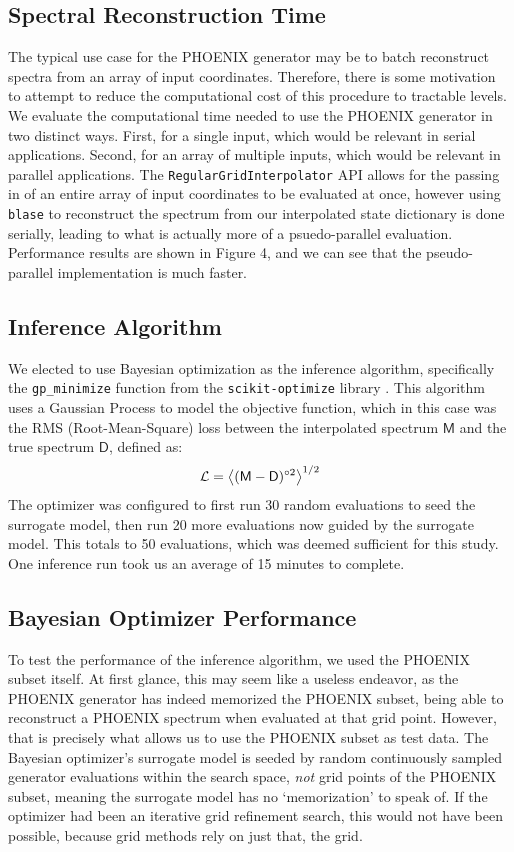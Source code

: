 \documentclass[twocolumn]{aastex631}
\begin{document}
\subsection{Spectral Reconstruction Time}
The typical use case for the PHOENIX generator may be to batch 
reconstruct spectra from an array of input coordinates. Therefore, there
is some motivation to attempt to reduce the computational cost of this
procedure to tractable levels. We evaluate the computational time needed
to use the PHOENIX generator in two distinct ways. First, for a single
input, which would be relevant in serial applications. Second, for an array
of multiple inputs, which would be relevant in parallel applications.
The \texttt{RegularGridInterpolator} API allows for the passing in of 
an entire array of input coordinates to be evaluated at once, however 
using \texttt{blase} to reconstruct the spectrum from our interpolated
state dictionary is done serially, leading to what is actually more of 
a psuedo-parallel evaluation. Performance results are shown in Figure 4,
and we can see that the pseudo-parallel implementation is much faster.

\subsection{Inference Algorithm}
We elected to use Bayesian optimization as the inference algorithm, specifically 
the \texttt{gp\_minimize} function from the \texttt{scikit-optimize} library \citep{skopt}. 
This algorithm uses a Gaussian Process to model the objective function, which in 
this case was the RMS (Root-Mean-Square) loss between the interpolated spectrum 
$\mathsf{M}$ and the true spectrum $\mathsf{D}$, defined as:
\begin{gather}
    \mathcal{L} = \ev{(\mathsf{M} - \mathsf{D})^{\circ 2}}^{1/2}
\end{gather}
The optimizer was configured to first run 30 random 
evaluations to seed the surrogate model, then run 20 more evaluations now guided 
by the surrogate model. This totals to 50 evaluations, which was deemed 
sufficient for this study. One inference run took us an average of 15 minutes to 
complete.

\subsection{Bayesian Optimizer Performance}
To test the performance of the inference algorithm, we used the PHOENIX subset
itself. At first glance, this may seem like a useless endeavor, as the 
PHOENIX generator has indeed memorized the PHOENIX subset, being able to
reconstruct a PHOENIX spectrum when evaluated at that grid point. However,
that is precisely what allows us to use the PHOENIX subset as test data.
The Bayesian optimizer's surrogate model is seeded by random continuously 
sampled generator evaluations within the search space, \textit{not} grid 
points of the PHOENIX subset, meaning the surrogate model has no `memorization' 
to speak of. If the optimizer had been an iterative grid refinement search, 
this would not have been possible, because grid methods rely on just that, 
the grid.
\end{document}
